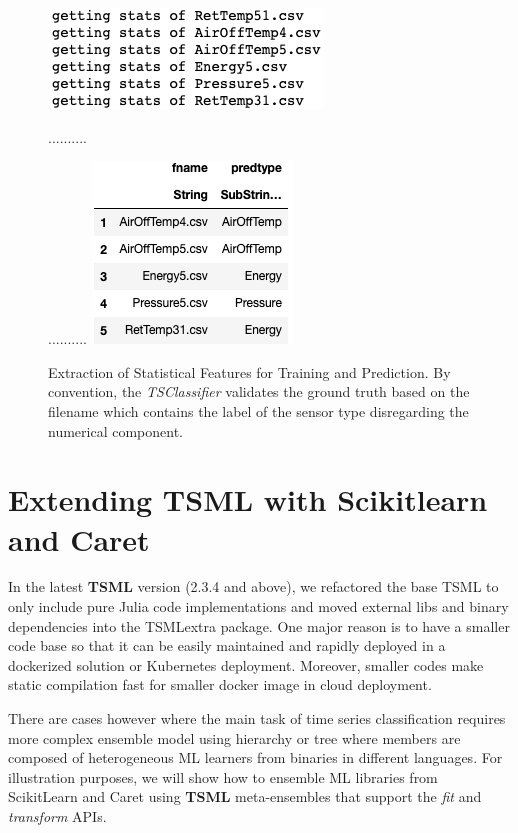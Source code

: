 \documentclass{juliacon}
\begin{document}
\begin{figure}[htbp]
   \centering
   \includegraphics[width=0.5\columnwidth]{tscl1.png} %
   
   ..........
   
   ..........
   \vskip 2pt
   \includegraphics[width=0.4\columnwidth]{tscl2.png} %
   \caption{Extraction of Statistical Features for Training and Prediction. By convention, the \emph{TSClassifier} validates the ground truth based on the filename which contains the label of the sensor type disregarding the numerical component.}
   \label{fig:tcl}
\end{figure}

\section{Extending TSML with Scikitlearn and Caret}
In the latest \textbf{TSML} version (2.3.4 and above), 
we refactored the base TSML
to only include pure Julia code implementations and moved
external libs and binary dependencies into the TSMLextra package. 
One major reason is to have a smaller code base so that it can be easily
maintained and rapidly deployed in a dockerized solution or Kubernetes deployment. Moreover, smaller codes make
static compilation fast for smaller docker image  
in cloud deployment. 

There are cases however where the main task of time series classification 
requires more complex ensemble model using hierarchy or tree where 
members are composed of heterogeneous ML learners from binaries in 
different languages. For illustration purposes, we will show how to 
ensemble ML libraries from ScikitLearn and Caret using \textbf{TSML} 
meta-ensembles that support the \emph{fit} and \emph{transform} APIs.
\end{document}
